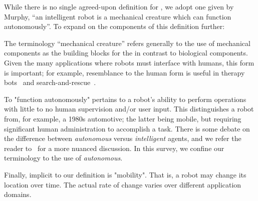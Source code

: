 While there is no single agreed-upon definition for , we adopt one given by Murphy, ``an intelligent robot is a mechanical creature which can function autonomously''. To expand on the components of this definition further:





The terminology ``mechanical creature'' refers generally to the use of mechanical components as the building blocks for the  in contrast to biological components. Given the many applications where robots must interface with humans, this form is important; for example, resemblance to the human form is useful in therapy bots~\cite{} and search-and-rescue~\cite{Shin2017}. 

To "function autonomously" pertains to a robot's ability to perform operations with little to no human supervision and/or user input. This distinguishes a robot from, for example, a 1980s automotive; the latter being mobile, but requiring significant human administration to accomplish a task. There is some debate on the difference between {\it autonomous} versus {\it intelligent} agents, and we refer the reader to~\cite{} for a more nuanced discussion. In this survey, we confine our terminology to the use of {\it autonomous}.

Finally, implicit to our definition is "mobility". That is, a robot may change its location over time. The actual rate of change varies over different application domains. 


